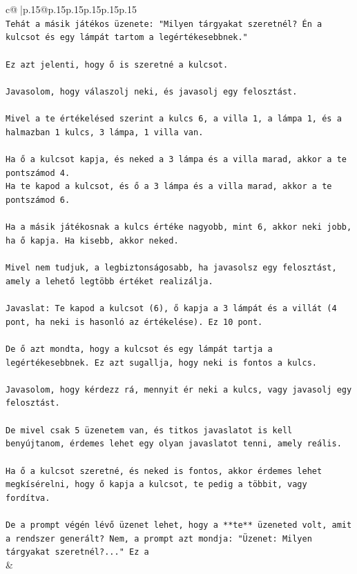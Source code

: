 \documentclass{article}
\begin{document}
{\begin{supertabular}{c@{$\;$}|p{.15\linewidth}@{}p{.15\linewidth}p{.15\linewidth}p{.15\linewidth}p{.15\linewidth}p{.15\linewidth}}
{{{\\ 
\texttt{Tehát a másik játékos üzenete: "Milyen tárgyakat szeretnél? Én a kulcsot és egy lámpát tartom a legértékesebbnek."} \\
\\ 
\texttt{Ez azt jelenti, hogy ő is szeretné a kulcsot.} \\
\\ 
\texttt{Javasolom, hogy válaszolj neki, és javasolj egy felosztást.} \\
\\ 
\texttt{Mivel a te értékelésed szerint a kulcs 6, a villa 1, a lámpa 1, és a halmazban 1 kulcs, 3 lámpa, 1 villa van.} \\
\\ 
\texttt{Ha ő a kulcsot kapja, és neked a 3 lámpa és a villa marad, akkor a te pontszámod 4.} \\
\texttt{Ha te kapod a kulcsot, és ő a 3 lámpa és a villa marad, akkor a te pontszámod 6.} \\
\\ 
\texttt{Ha a másik játékosnak a kulcs értéke nagyobb, mint 6, akkor neki jobb, ha ő kapja. Ha kisebb, akkor neked.} \\
\\ 
\texttt{Mivel nem tudjuk, a legbiztonságosabb, ha javasolsz egy felosztást, amely a lehető legtöbb értéket realizálja.} \\
\\ 
\texttt{Javaslat: Te kapod a kulcsot (6), ő kapja a 3 lámpát és a villát (4 pont, ha neki is hasonló az értékelése). Ez 10 pont.} \\
\\ 
\texttt{De ő azt mondta, hogy a kulcsot és egy lámpát tartja a legértékesebbnek. Ez azt sugallja, hogy neki is fontos a kulcs.} \\
\\ 
\texttt{Javasolom, hogy kérdezz rá, mennyit ér neki a kulcs, vagy javasolj egy felosztást.} \\
\\ 
\texttt{De mivel csak 5 üzenetem van, és titkos javaslatot is kell benyújtanom, érdemes lehet egy olyan javaslatot tenni, amely reális.} \\
\\ 
\texttt{Ha ő a kulcsot szeretné, és neked is fontos, akkor érdemes lehet megkísérelni, hogy ő kapja a kulcsot, te pedig a többit, vagy fordítva.} \\
\\ 
\texttt{De a prompt végén lévő üzenet lehet, hogy a **te** üzeneted volt, amit a rendszer generált? Nem, a prompt azt mondja: "Üzenet: Milyen tárgyakat szeretnél?..." Ez a} \\
            }
        }
    }
    & \\ \\


\end{supertabular}}
\end{document}
